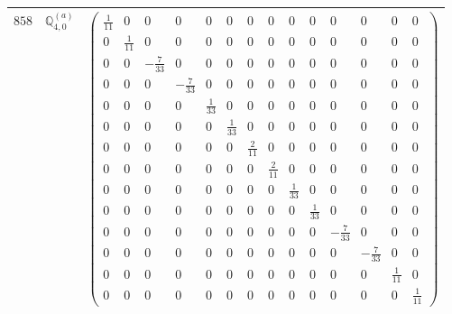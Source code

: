 \documentclass[fleqn,8pt,landscape]{jsarticle}
\begin{document}
\begin{center}
\begin{longtable}{ccc}
$ 858 $ & $ \mathbb{Q}_{4,0}^{(a)} $ & $ \begin{pmatrix} \frac{1}{11} & 0 & 0 & 0 & 0 & 0 & 0 & 0 & 0 & 0 & 0 & 0 & 0 & 0 \\ 0 & \frac{1}{11} & 0 & 0 & 0 & 0 & 0 & 0 & 0 & 0 & 0 & 0 & 0 & 0 \\ 0 & 0 & - \frac{7}{33} & 0 & 0 & 0 & 0 & 0 & 0 & 0 & 0 & 0 & 0 & 0 \\ 0 & 0 & 0 & - \frac{7}{33} & 0 & 0 & 0 & 0 & 0 & 0 & 0 & 0 & 0 & 0 \\ 0 & 0 & 0 & 0 & \frac{1}{33} & 0 & 0 & 0 & 0 & 0 & 0 & 0 & 0 & 0 \\ 0 & 0 & 0 & 0 & 0 & \frac{1}{33} & 0 & 0 & 0 & 0 & 0 & 0 & 0 & 0 \\ 0 & 0 & 0 & 0 & 0 & 0 & \frac{2}{11} & 0 & 0 & 0 & 0 & 0 & 0 & 0 \\ 0 & 0 & 0 & 0 & 0 & 0 & 0 & \frac{2}{11} & 0 & 0 & 0 & 0 & 0 & 0 \\ 0 & 0 & 0 & 0 & 0 & 0 & 0 & 0 & \frac{1}{33} & 0 & 0 & 0 & 0 & 0 \\ 0 & 0 & 0 & 0 & 0 & 0 & 0 & 0 & 0 & \frac{1}{33} & 0 & 0 & 0 & 0 \\ 0 & 0 & 0 & 0 & 0 & 0 & 0 & 0 & 0 & 0 & - \frac{7}{33} & 0 & 0 & 0 \\ 0 & 0 & 0 & 0 & 0 & 0 & 0 & 0 & 0 & 0 & 0 & - \frac{7}{33} & 0 & 0 \\ 0 & 0 & 0 & 0 & 0 & 0 & 0 & 0 & 0 & 0 & 0 & 0 & \frac{1}{11} & 0 \\ 0 & 0 & 0 & 0 & 0 & 0 & 0 & 0 & 0 & 0 & 0 & 0 & 0 & \frac{1}{11} \end{pmatrix} $ \\ \hline

\end{longtable}
\end{center}
\end{document}
